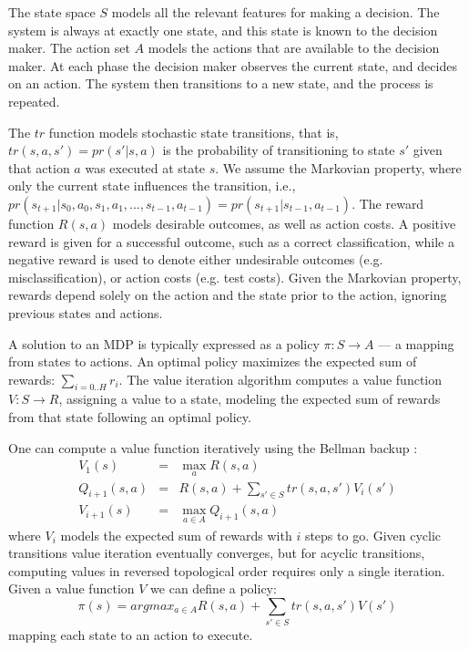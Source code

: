 \documentclass[letterpaper]{article}
\theoremstyle{definition}
\begin{document}
The state space $S$ models all the relevant features for making a decision. The system is always at exactly one state, and this state is known to the decision maker. The action set $A$ models the actions that are available to the decision maker. At each phase the decision maker observes the current state, and decides on an action. The system then transitions to a new state, and the process is repeated.

The $tr$ function models stochastic state transitions, that is, $tr(s,a,s')=pr(s'|s,a)$ is the probability of transitioning to state $s'$ given that action $a$ was executed at state $s$. We assume the Markovian property, where only the current state influences the transition, i.e., $pr(s_{t+1}|s_0,a_0,s_1,a_1,...,s_{t-1},a_{t-1})=pr(s_{t+1}|s_{t-1},a_{t-1})$.
The reward function $R(s,a)$ models desirable outcomes, as well as action costs.
A positive reward is given for a successful outcome, such as a correct classification, while a negative reward is used to denote either undesirable outcomes (e.g. misclassification), or action costs (e.g. test costs). Given the Markovian property, rewards depend solely on the action and the state prior to the action, ignoring previous states and actions.


A solution to an MDP is typically expressed as a policy $\pi:S\rightarrow A$ --- a mapping from states to actions. An optimal policy maximizes the expected sum of rewards: $\sum_{i=0..H} r_i$. The value iteration algorithm computes a value function $V:S \rightarrow R$, assigning a value to a state, modeling the expected sum of rewards from that state following an optimal policy.

One can compute a value function iteratively using the Bellman backup \cite{Bellman}:
{\footnotesize
\begin{eqnarray}
V_1(s)&=&\max_a R(s,a)\\
Q_{i+1}(s,a)&=&R(s,a) + \sum_{s' \in S}tr(s,a,s') V_i(s')\\
V_{i+1}(s)&=& \max_{a \in A}  Q_{i+1}(s,a)
\end{eqnarray}
}
where $V_i$ models the expected sum of rewards with $i$ steps to go. Given cyclic transitions value iteration eventually converges,
but for acyclic transitions, computing values in reversed topological order requires only a single iteration.
Given a value function $V$ we can define a policy:
{\footnotesize
\begin{equation}
\pi(s)=argmax_{a \in A} R(s,a) + \sum_{s' \in S} tr(s,a,s') V(s')
\end{equation}
}
mapping each state to an action to execute.
\end{document}
